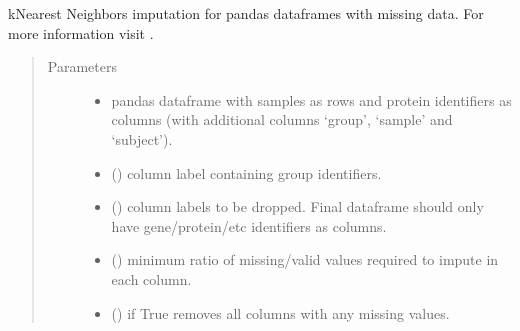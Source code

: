 \documentclass[letterpaper,10pt,english]{sphinxmanual}
\begin{document}

\begin{fulllineitems}
\label{\detokenize{_autosummary/analytics_core.analytics:analytics_core.analytics.analytics.imputation_KNN}}
k\sphinxhyphen{}Nearest Neighbors imputation for pandas dataframes with missing data. For more information visit .
\begin{quote}\begin{description}
\item[{Parameters}] \leavevmode\begin{itemize}
\item {} 
 \textendash{} pandas dataframe with samples as rows and protein identifiers as columns (with additional columns ‘group’, ‘sample’ and ‘subject’).

\item {} 
 () \textendash{} column label containing group identifiers.

\item {} 
 () \textendash{} column labels to be dropped. Final dataframe should only have gene/protein/etc identifiers as columns.

\item {} 
 () \textendash{} minimum ratio of missing/valid values required to impute in each column.

\item {} 
 () \textendash{} if True removes all columns with any missing values.


\end{itemize}
\end{description}
\end{quote}
\end{fulllineitems}
\end{document}
